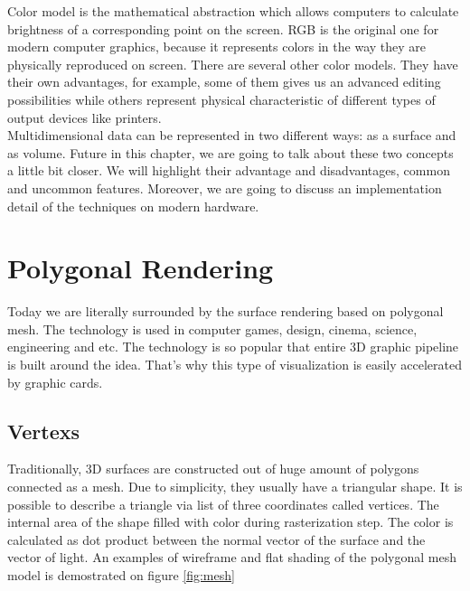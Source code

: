 \documentclass[twoside, english, 11pt]{report}
\begin{document}
Color model is the mathematical abstraction which allows computers to calculate brightness of a corresponding point on the screen. RGB is the original one for modern computer graphics, because it represents colors in the way they are physically reproduced on screen. There are several other color models. They have their own advantages, for example, some of them gives us an advanced editing possibilities while others represent physical characteristic of different types of output devices like printers.\\

Multidimensional data can be represented in two different ways: as a surface and as volume. Future in this chapter, we are going to talk about these two concepts a little bit closer. We will highlight their advantage and disadvantages, common and uncommon features. Moreover, we are going to discuss an implementation detail of the techniques on modern hardware.



\section{Polygonal Rendering}

Today we are literally surrounded by the surface rendering based on polygonal mesh. The technology is used in computer games, design, cinema, science, engineering and etc. The technology is so popular that entire 3D graphic pipeline is built around the idea. That's why this type of visualization is easily accelerated by graphic cards.\\

\subsection{Vertexs}
Traditionally, 3D surfaces are constructed out of huge amount of polygons connected as a mesh. Due to simplicity, they usually have a triangular shape. It is possible to describe a triangle via list of three coordinates called vertices. The internal area of the shape filled with color during rasterization step. The color is calculated as dot product between the normal vector of the surface and the vector of light. An examples of wireframe and flat shading of the polygonal mesh model is demostrated on figure \ref{fig:mesh}
\end{document}
